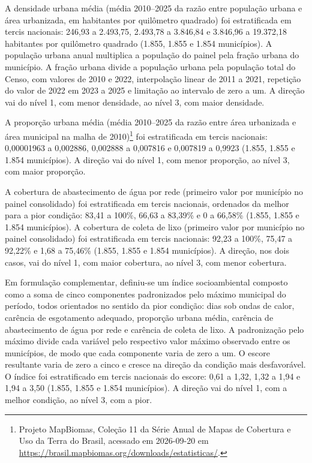 A densidade urbana média (média 2010--2025 da razão entre população urbana e área urbanizada, em habitantes por quilômetro quadrado) foi estratificada em tercis nacionais: 246,93 a 2.493,75, 2.493,78 a 3.846,84 e 3.846,96 a 19.372,18 habitantes por quilômetro quadrado (1.855, 1.855 e 1.854 municípios). A população urbana anual multiplica a população do painel pela fração urbana do município. A fração urbana divide a população urbana pela população total do Censo, com valores de 2010 e 2022, interpolação linear de 2011 a 2021, repetição do valor de 2022 em 2023 a 2025 e limitação ao intervalo de zero a um. A direção vai do nível 1, com menor densidade, ao nível 3, com maior densidade.

A proporção urbana média (média 2010--2025 da razão entre área urbanizada e área municipal na malha de 2010)\footnote{Projeto MapBiomas, Coleção 11 da Série Anual de Mapas de Cobertura e Uso da Terra do Brasil, acessado em 2026-09-20 em \url{https://brasil.mapbiomas.org/downloads/estatisticas/}.} foi estratificada em tercis nacionais: 0,00001963 a 0,002886, 0,002888 a 0,007816 e 0,007819 a 0,9923 (1.855, 1.855 e 1.854 municípios). A direção vai do nível 1, com menor proporção, ao nível 3, com maior proporção.

A cobertura de abastecimento de água por rede (primeiro valor por município no painel consolidado) foi estratificada em tercis nacionais, ordenados da melhor para a pior condição: 83,41 a 100\%, 66,63 a 83,39\% e 0 a 66,58\% (1.855, 1.855 e 1.854 municípios). A cobertura de coleta de lixo (primeiro valor por município no painel consolidado) foi estratificada em tercis nacionais: 92,23 a 100\%, 75,47 a 92,22\% e 1,68 a 75,46\% (1.855, 1.855 e 1.854 municípios). A direção, nos dois casos, vai do nível 1, com maior cobertura, ao nível 3, com menor cobertura.

Em formulação complementar, definiu-se um índice socioambiental composto como a soma de cinco componentes padronizados pelo máximo municipal do período, todos orientados no sentido da pior condição: dias sob ondas de calor, carência de esgotamento adequado, proporção urbana média, carência de abastecimento de água por rede e carência de coleta de lixo. A padronização pelo máximo divide cada variável pelo respectivo valor máximo observado entre os municípios, de modo que cada componente varia de zero a um. O escore resultante varia de zero a cinco e cresce na direção da condição mais desfavorável. O índice foi estratificado em tercis nacionais do escore: 0,61 a 1,32, 1,32 a 1,94 e 1,94 a 3,50 (1.855, 1.855 e 1.854 municípios). A direção vai do nível 1, com a melhor condição, ao nível 3, com a pior.

